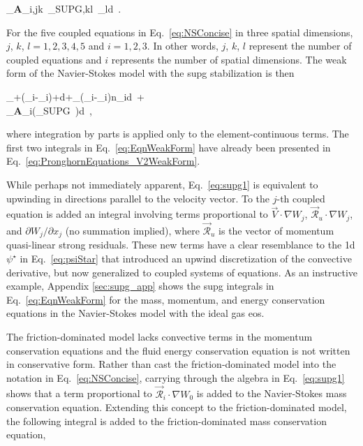 \beq
\label{eq:supg2}
\int_\Omega\epsilon\textbf{A}_{i,jk\ }\tau_{SUPG,kl\ }_ld\Omega\ .
\eeq

\noindent For the five coupled equations in Eq.\ \eqref{eq:NSConcise} in three spatial dimensions, \(j\), \(k\), \(l=1,2,3,4,5\) and \(i=1,2,3\). In other words, \(j\), \(k\), \(l\) represent the number of coupled equations and \(i\) represents the number of spatial dimensions. The weak form of the Navier-Stokes model with the \gls{supg} stabilization is then

\beqa
\label{eq:EqnWeakForm}
\int_{\Omega}\left\lbrack\epsilon{}\cdot{}+\cdot\left(_i-\epsilon{}_i\right)+\cdot{}\right\rbrack d\Omega+\int_{\Gamma}\left(\epsilon{}_i-_i\right)\cdot{}n_id\Gamma\ +\hspace{1cm}\\
\int_\Omega\epsilon\left\lbrack\textbf{A}_i\left(\tau_{SUPG}\ \right)\right\rbrack\cdot{}d\ ,
\eeqa

\noindent where integration by parts is applied only to the element-continuous terms. The first two integrals in Eq.\ \eqref{eq:EqnWeakForm} have already been presented in Eq.\ \eqref{eq:PronghornEquations_V2WeakForm}.

While perhaps not immediately apparent, Eq.\ \eqref{eq:supg1} is equivalent to upwinding in directions parallel to the velocity vector. To the \(j\)-th coupled equation is added an integral involving terms proportional to \(\vec{V}\cdot\nabla W_j\), \(\vec{\mathscr{R}}_u\cdot\nabla W_j\), and \(\partial W_j/\partial x_j\) (no summation implied), where \(\vec{\mathscr{R}}_u\) is the vector of momentum quasi-linear strong residuals. These new terms have a clear resemblance to the \gls{1d} \(\psi^\star\) in Eq.\ \eqref{eq:psiStar} that introduced an upwind discretization of the convective derivative, but now generalized to coupled systems of equations. As an instructive example, Appendix \ref{sec:supg_app} shows the \gls{supg} integrals in Eq.\ \eqref{eq:EqnWeakForm} for the mass, momentum, and energy conservation equations in the Navier-Stokes model with the ideal gas \gls{eos}.

The friction-dominated model lacks convective terms in the momentum conservation equations and the fluid energy conservation equation is not written in conservative form. Rather than cast the friction-dominated model into the notation in Eq.\ \eqref{eq:NSConcise}, carrying through the algebra in Eq.\ \eqref{eq:supg1} shows that a term proportional to \(\vec{\mathscr{R}}_i\cdot\nabla W_0\) is added to the Navier-Stokes mass conservation equation. Extending this concept to the friction-dominated model, the following integral is added to the friction-dominated mass conservation equation,

